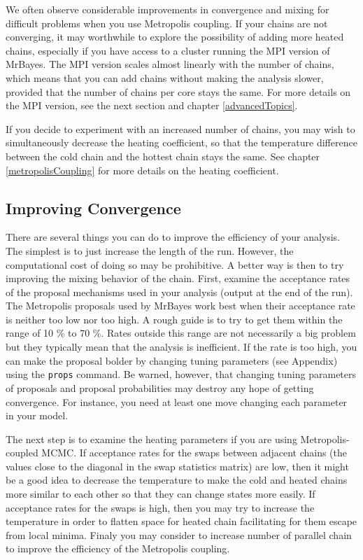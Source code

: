 \documentclass[12pt]{book}
\newcommand{\ttt}[1]{\texttt{#1}}
\begin{document}
We often observe considerable improvements in convergence and mixing for difficult problems when
you use Metropolis coupling. If your chains are not converging, it may worthwhile to explore the
possibility of adding more heated chains, especially if you have access to a cluster running the
MPI version of MrBayes. The MPI version scales almost linearly with the number of chains, which
means that you can add chains without making the analysis slower, provided that the number of
chains per core stays the same. For more details on the MPI version, see the next section and
chapter \ref{advancedTopics}.

If you decide to experiment with an increased number of chains, you may wish to simultaneously
decrease the heating coefficient, so that the temperature difference between the cold chain and the
hottest chain stays the same. See chapter \ref{metropolisCoupling} for more details on the heating
coefficient.

\subsection{Improving Convergence}

There are several things you can do to improve the efficiency of your analysis. The simplest is to
just increase the length of the run. However, the computational cost of doing so may be
prohibitive. A better way is then to try improving the mixing behavior of the chain. First, examine
the acceptance rates of the proposal mechanisms used in your analysis (output at the end of the
run). The Metropolis proposals used by MrBayes work best when their acceptance rate is neither too
low nor too high. A rough guide is to try to get them within the range of 10 \% to 70 \%. Rates
outside this range are not necessarily a big problem but they typically mean that the analysis is
inefficient. If the rate is too high, you can make the proposal bolder by changing tuning
parameters (see Appendix) using the \ttt{props} command. Be warned, however, that changing tuning
parameters of proposals and proposal probabilities may destroy any hope of getting convergence. For
instance, you need at least one move changing each parameter in your model.

The next step is to examine the heating parameters if you are using Metropolis-coupled MCMC. If
acceptance rates for the swaps between adjacent chains (the values close to the diagonal in the
swap statistics matrix) are low, then it might be a good idea to decrease the temperature to make
the cold and heated chains more similar to each other so that they can change states more easily.
If acceptance rates for the swaps is high, then you may try to increase the temperature in order to
flatten space for heated chain facilitating for them escape from local minima. Finaly you may
consider to increase number of parallel chain to improve the efficiency of the Metropolis coupling.
\end{document}
